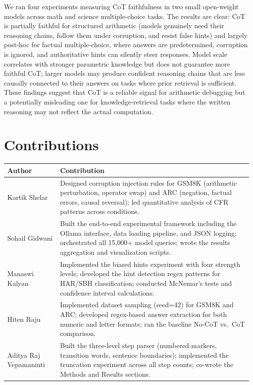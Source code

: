 \documentclass[11pt,twocolumn]{article}
\begin{document}
We ran four experiments measuring CoT faithfulness in two small open-weight
models across math and science multiple-choice tasks. The results are clear:
CoT is partially faithful for structured arithmetic (models genuinely need
their reasoning chains, follow them under corruption, and resist false
hints) and largely post-hoc for factual multiple-choice, where answers are
predetermined, corruption is ignored, and authoritative hints can silently
steer responses. Model scale correlates with stronger parametric knowledge
but does not guarantee more faithful CoT; larger models may produce confident
reasoning chains that are less causally connected to their answers on tasks
where prior retrieval is sufficient. These findings suggest that CoT is a
reliable signal for arithmetic debugging but a potentially misleading one for
knowledge-retrieval tasks where the written reasoning may not reflect the
actual computation.





\clearpage
\onecolumn
\section*{Contributions}

\begin{center}
\small
\begin{tabular}{lp{13.5cm}}
\toprule
\textbf{Author} & \textbf{Contribution} \\
\midrule
Kartik Shelar &
  Designed corruption injection rules for GSM8K (arithmetic perturbation,
  operator swap) and ARC (negation, factual errors, causal reversal); led
  quantitative analysis of CFR patterns across conditions. \\
Sohail Gidwani &
  Built the end-to-end experimental framework including the Ollama interface,
  data loading pipeline, and JSON logging; orchestrated all 15{,}000+ model
  queries; wrote the results aggregation and visualization scripts. \\
Manaswi Kalyan &
  Implemented the biased hints experiment with four strength levels;
  developed the hint detection regex patterns for HAR/SBH classification;
  conducted McNemar's tests and confidence interval calculations. \\
Hiten Raju &
  Implemented dataset sampling (seed=42) for GSM8K and ARC; developed
  regex-based answer extraction for both numeric and letter formats; ran
  the baseline No-CoT vs.\ CoT comparison. \\
Aditya Raj Vepamaninti &
  Built the three-level step parser (numbered markers, transition words,
  sentence boundaries); implemented the truncation experiment across all
  step counts; co-wrote the Methods and Results sections. \\
\bottomrule
\end{tabular}
\end{center}
\end{document}
